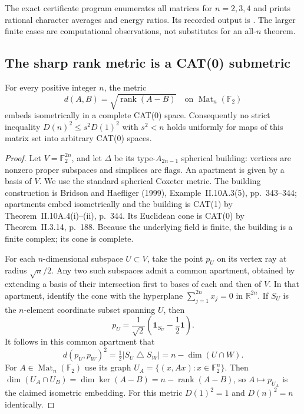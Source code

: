 The exact certificate program 
enumerates all matrices for $n=2,3,4$ and prints rational character averages
and energy ratios. Its recorded output is
. The larger finite cases are
computational observations, not substitutes for an all-$n$ theorem.

\subsection{The sharp rank metric is a CAT(0) submetric}

\begin{proposition}
\label{pg:building}
For every positive integer $n$, the metric
\[
 d(A,B)=\sqrt{\operatorname{rank}(A-B)}
 \quad\text{on }\operatorname{Mat}_n(\mathbb F_2)
\]
embeds isometrically in a complete CAT(0) space. Consequently no strict
inequality $D(n)^2\leq s^2D(1)^2$ with $s^2<n$ holds uniformly for maps
of this matrix set into arbitrary CAT(0) spaces.
\end{proposition}
\begin{proof}
Let $V=\mathbb F_2^{2n}$, and let $\Delta$ be its type-$A_{2n-1}$
spherical building: vertices are nonzero proper subspaces and simplices
are flags. An apartment is given by a basis of $V$. We use the standard
spherical Coxeter metric. The building construction is Bridson and
Haefliger (1999), Example~II.10A.3(5), pp.~343--344; apartments embed
isometrically and the building is CAT(1) by Theorem~II.10A.4(i)--(ii),
p.~344. Its Euclidean cone is CAT(0) by Theorem~II.3.14, p.~188.
Because the underlying field is finite, the building is a finite complex;
its cone is complete.

For each $n$-dimensional subspace $U\subset V$, take the point $p_U$
on its vertex ray at radius $\sqrt n/2$. Any two such subspaces admit
a common apartment, obtained by extending a basis of their intersection
first to bases of each and then of $V$. In that apartment, identify the
cone with the hyperplane $\sum_{j=1}^{2n}x_j=0$ in $\mathbb R^{2n}$.
If $S_U$ is the $n$-element coordinate subset spanning $U$, then
\[
 p_U=\frac1{\sqrt2}\left(\mathbf1_{S_U}-\frac12\mathbf1\right).
\]
It follows in this common apartment that
\[
 d(p_U,p_W)^2
 =\tfrac12\lvert S_U\mathbin\triangle S_W\rvert
 =n-\dim(U\cap W).
\]
For $A\in\operatorname{Mat}_n(\mathbb F_2)$ use its graph
$U_A=\{(x,Ax):x\in\mathbb F_2^n\}$. Then
$\dim(U_A\cap U_B)=\dim\ker(A-B)=n-\operatorname{rank}(A-B)$,
so $A\mapsto p_{U_A}$ is the claimed isometric embedding.
For this metric $D(1)^2=1$ and $D(n)^2=n$ identically.
\end{proof}

